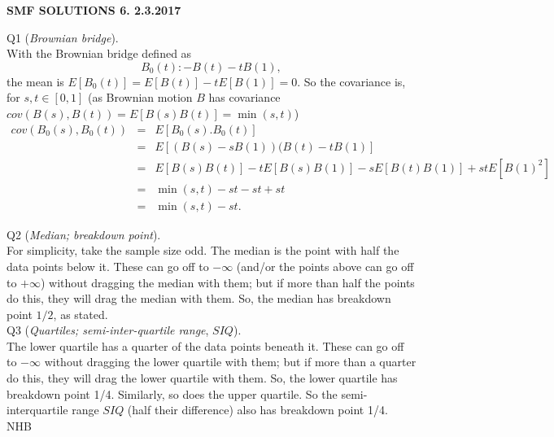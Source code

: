 \documentclass[12pt]{article}
\begin{document}
\def\ni{\noindent}
\def\i{\indent}
\def\a{\alpha}
\def\b{\beta}
\def\e{\epsilon}
\def\d{\delta}
\def\g{\gamma}
\def\qq{\qquad}
\def\q{\quad}
\def\L{\Lambda}
\def\C{\cal C}
\def\E{\cal E}
\def\G{\Gamma}
\def\F{\cal F}
\def\K{\cal K}
\def\O{\cal O}
\def\A{\cal A}
\def\B{\cal B}
\def\S{\cal S}
\def\N{\cal N}
\def\M{\cal M}
\def\P{\cal P}
\def\Om{\Omega}
\def\om{\omega}
\def\s{\sigma}
\def\t{\theta}
\def\z{\zeta}
\def\p{\phi}
\def\m{\mu}
\def\n{\nu}
\def\b{\beta}
\def\e{\epsilon}
\def\l{\lambda}
\def\Si{\Sigma}
\def\half{\frac{1}{2}}
\def\hb{\hfil \break}
\begin{center}
{\bf SMF SOLUTIONS 6.  2.3.2017} \\
\end{center}

\ni Q1 ({\it Brownian bridge}). \\
\i With the Brownian bridge defined as
$$
B_0(t) :- B(t) - t B(1),
$$
the mean is $E[B_0(t)] = E[B(t)] - t E[B(1)] = 0$.  So the covariance is, for $s, t \in [0,1]$    (as Brownian motion $B$ has covariance $cov(B(s), B(t)) = E[B(s)B(t)] = \min (s,t)$)
\begin{eqnarray*}
cov(B_0(s), B_0(t))
&=& E[B_0(s).B_0(t)] \\
&=& E[(B(s) - s B(1))(B(t) - t B(1)] \\
&=& E[B(s) B(t)] - t E[B(s) B(1)] - s E[B(t) B(1)] + st E[B(1)^2] \\
&=& \min (s,t) - st - st + st \\
&=& \min (s,t) - st.
\end{eqnarray*}

\ni Q2 ({\it Median; breakdown point}). \\
\i For simplicity, take the sample size odd.  The median is the point with half the data points below it.  These can go off to $- \infty$ (and/or the points above can go off to $+ \infty$) without dragging the median with them; but if more than half the points do this, they will drag the median with them.  So, the median has breakdown point $1/2$, as stated. \\

\ni Q3 ({\it Quartiles; semi-inter-quartile range}, $SIQ$). \\
\i The lower quartile has a quarter of the data points beneath it.  These can go off to $- \infty$ without dragging the lower quartile with them; but if more than a quarter do this, they will drag the lower quartile with them.  So, the lower quartile has breakdown point 1/4.  Similarly, so does the upper quartile.  So the semi-interquartile range $SIQ$ (half their difference) also has breakdown point 1/4. \\ 

\hfil NHB \break
\end{document}

